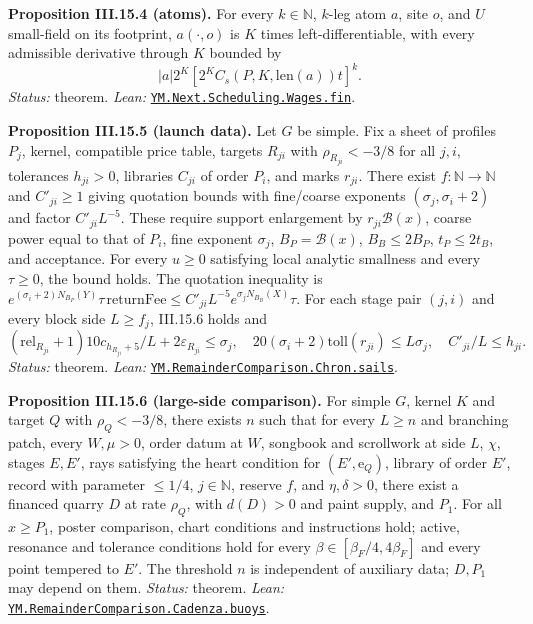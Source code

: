 \documentclass[
  letterpaper,
  11pt]{article}
\begin{document}
\textbf{Proposition III.15.4 (atoms).} For every \(k\in\mathbb N\),
\(k\)-leg atom \(a\), site \(o\), and \(U\) small-field on its
footprint, \(a(\cdot,o)\) is \(K\) times left-differentiable, with every
admissible derivative through \(K\) bounded by
\[|a|2^K[2^KC_s(P,K,\mathrm{len}(a))t]^k.\] \emph{Status:} theorem.
\emph{Lean:}
\href{https://github.com/yang-mills-group/OpenAI-YM-20261028/blob/3456e5e75cf8d4cd558955a5c7638fba2d68f464/YM/Next/SCHEDULE/TensorCost.lean\#L56-L71}{\texttt{YM.Next.Scheduling.Wages.fin}}.

\textbf{Proposition III.15.5 (launch data).} Let \(G\) be simple. Fix a
sheet of profiles \(P_j\), kernel, compatible price table, targets
\(R_{ji}\) with \(\rho_{R_{ji}}<-3/8\) for all \(j,i\), tolerances
\(h_{ji}>0\), libraries \(C_{ji}\) of order \(P_i\), and marks
\(r_{ji}\). There exist \(f:\mathbb N\to\mathbb N\) and \(C'_{ji}\ge1\)
giving quotation bounds with fine/coarse exponents
\((\sigma_j,\sigma_i+2)\) and factor \(C'_{ji}L^{-5}\). These require
support enlargement by \(r_{ji}\mathcal B(x)\), coarse power equal to
that of \(P_i\), fine exponent \(\sigma_j\), \(B_P=\mathcal B(x)\),
\(B_B\le2B_P\), \(t_P\le2t_B\), and acceptance. For every \(u\ge0\)
satisfying local analytic smallness and every \(\tau\ge0\), the bound
holds. The quotation inequality is
\(e^{(\sigma_i+2)N_{B_P}(Y)}\tau\,\mathrm{returnFee}\le C'_{ji}L^{-5}e^{\sigma_jN_{B_B}(X)}\tau\).
For each stage pair \((j,i)\) and every block side \(L\ge f_j\),
III.15.6 holds and
\[(\mathrm{rel}_{R_{ji}}+1)10c_{h_{R_{ji}}+5}/L+2\varepsilon_{R_{ji}}\le\sigma_j,\quad20(\sigma_i+2)\mathrm{toll}(r_{ji})\le L\sigma_j,\quad C'_{ji}/L\le h_{ji}.\]
\emph{Status:} theorem. \emph{Lean:}
\href{https://github.com/yang-mills-group/OpenAI-YM-20261028/blob/3456e5e75cf8d4cd558955a5c7638fba2d68f464/YM/RemainderComparison/Chron/Age.lean\#L98-L111}{\texttt{YM.RemainderComparison.Chron.sails}}.

\textbf{Proposition III.15.6 (large-side comparison).} For simple \(G\),
kernel \(K\) and target \(Q\) with \(\rho_Q<-3/8\), there exists \(n\)
such that for every \(L\ge n\) and branching patch, every \(W,\mu>0\),
order datum at \(W\), songbook and scrollwork at side \(L\), \(\chi\),
stages \(E,E'\), rays satisfying the heart condition for
\((E',\mathrm e_Q)\), library of order \(E'\), record with parameter
\(\le1/4\), \(j\in\mathbb N\), reserve \(f\), and \(\eta,\delta>0\),
there exist a financed quarry \(D\) at rate \(\rho_Q\), with \(d(D)>0\)
and paint supply, and \(P_1\). For all \(x\ge P_1\), poster comparison,
chart conditions and instructions hold; active, resonance and tolerance
conditions hold for every \(\beta\in[\beta_F/4,4\beta_F]\) and every
point tempered to \(E'\). The threshold \(n\) is independent of
auxiliary data; \(D,P_1\) may depend on them. \emph{Status:} theorem.
\emph{Lean:}
\href{https://github.com/yang-mills-group/OpenAI-YM-20261028/blob/3456e5e75cf8d4cd558955a5c7638fba2d68f464/YM/RemainderComparison/Cadenza/Syllabus.lean\#L47-L58}{\texttt{YM.RemainderComparison.Cadenza.buoys}}.
\end{document}
